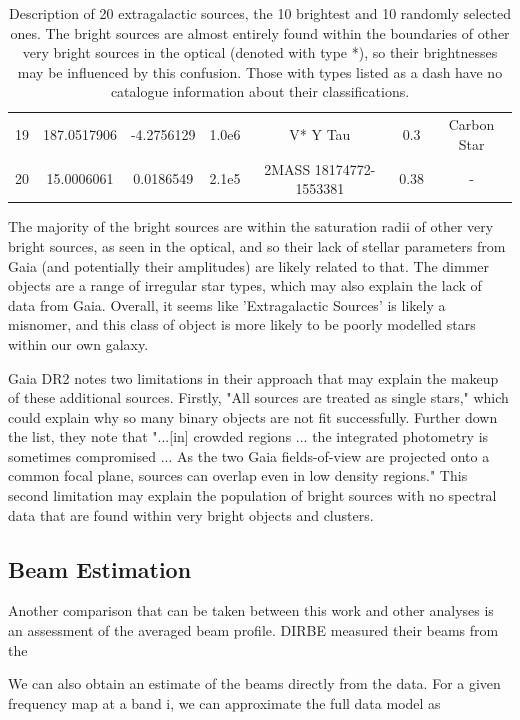 \documentclass{aa}
\begin{document}
\begin{table}
\begin{tabular}{l c c c c c c}
	 19 & 187.0517906 & -4.2756129 & 1.0e6 &  	V* Y Tau & 0.3 & Carbon Star\\
	 20 & 15.0006061 & 0.0186549 & 2.1e5 & 2MASS 18174772-1553381 & 0.38 & - \\
     \hline
    \end{tabular}
    \caption{Description of 20 extragalactic sources, the 10 brightest and 10 randomly selected ones. The bright sources are almost entirely found within the boundaries of other very bright sources in the optical (denoted with type *), so their brightnesses may be influenced by this confusion. Those with types listed as a dash have no catalogue information about their classifications.}
    \label{tab:exgal}
\end{table}

The majority of the bright sources are within the saturation radii of other very bright sources, as seen in the optical, and so their lack of stellar parameters from Gaia (and potentially their amplitudes) are likely related to that. The dimmer objects are a range of irregular star types, which may also explain the lack of data from Gaia. Overall, it seems like 'Extragalactic Sources' is likely a misnomer, and this class of object is more likely to be poorly modelled stars within our own galaxy.

Gaia DR2 notes two limitations in their approach that may explain the makeup of these additional sources. Firstly, "All sources are treated as single stars," which could explain why so many binary objects are not fit successfully. Further down the list, they note that "...[in] crowded regions ... the integrated photometry is sometimes compromised ... As the two Gaia fields-of-view are projected onto a common focal plane, sources can overlap even in low density regions." \citep{gaiaClassification} This second limitation may explain the population of bright sources with no spectral data that are found within very bright objects and clusters.

\subsection{Beam Estimation}

Another comparison that can be taken between this work and other analyses is an assessment of the averaged beam profile. DIRBE measured their beams from the 

We can also obtain an estimate of the beams directly from the data. For a given frequency map at a band i, we can approximate the full data model as 
\end{document}
